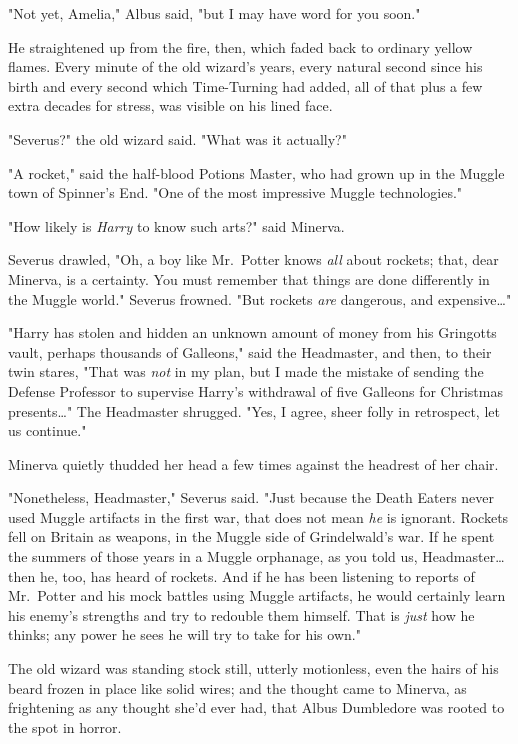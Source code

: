 "Not yet, Amelia," Albus said, "but I may have word for you soon."

He straightened up from the fire, then, which faded back to ordinary yellow 
flames. Every minute of the old wizard's years, every natural second since his 
birth and every second which Time-Turning had added, all of that plus a few 
extra decades for stress, was visible on his lined face.

"Severus?" the old wizard said. "What was it actually?"

"A rocket," said the half-blood Potions Master, who had grown up in the Muggle 
town of Spinner's End. "One of the most impressive Muggle technologies."

"How likely is \emph{Harry} to know such arts?" said Minerva.

Severus drawled, "Oh, a boy like Mr.~Potter knows \emph{all} about rockets; 
that, dear Minerva, is a certainty. You must remember that things are done 
differently in the Muggle world." Severus frowned. "But rockets \emph{are} 
dangerous, and expensive{\ldots}"

"Harry has stolen and hidden an unknown amount of money from his Gringotts 
vault, perhaps thousands of Galleons," said the Headmaster, and then, to their 
twin stares, "That was \emph{not} in my plan, but I made the mistake of sending 
the Defense Professor to supervise Harry's withdrawal of five Galleons for 
Christmas presents{\ldots}" The Headmaster shrugged. "Yes, I agree, sheer folly 
in retrospect, let us continue."

Minerva quietly thudded her head a few times against the headrest of her chair.

"Nonetheless, Headmaster," Severus said. "Just because the Death Eaters never 
used Muggle artifacts in the first war, that does not mean \emph{he} is 
ignorant. Rockets fell on Britain as weapons, in the Muggle side of 
Grindelwald's war. If he spent the summers of those years in a Muggle 
orphanage, as you told us, Headmaster{\ldots} then he, too, has heard of 
rockets. And if he has been listening to reports of Mr.~Potter and his mock 
battles using Muggle artifacts, he would certainly learn his enemy's strengths 
and try to redouble them himself. That is \emph{just} how he thinks; any power 
he sees he will try to take for his own."

The old wizard was standing stock still, utterly motionless, even the hairs of 
his beard frozen in place like solid wires; and the thought came to Minerva, as 
frightening as any thought she'd ever had, that Albus Dumbledore was rooted to 
the spot in horror.


